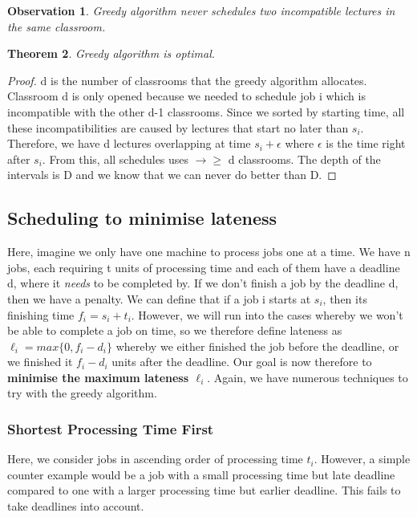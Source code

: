 \documentclass[11pt, oneside]{article}
\newtheorem{theorem}{Theorem}
\newtheorem{observation}[theorem]{\textbf{Observation}}
\theoremstyle{definition}
\begin{document}
\begin{observation}
  Greedy algorithm never schedules two incompatible lectures in the same classroom.
\end{observation}

\begin{theorem}
  Greedy algorithm is optimal.
\end{theorem}
\begin{proof}
  d is the number of classrooms that the greedy algorithm allocates. Classroom d is only opened because we needed to schedule job i which is incompatible with the other d-1 classrooms. Since we sorted by starting time, all these incompatibilities are caused by lectures that start no later than $s_i$. Therefore, we have d lectures overlapping at time $s_i + \epsilon$ where $\epsilon$ is the time right after $s_i$. From this, all schedules uses $\rightarrow \geq$ d classrooms. The depth of the intervals is D and we know that we can never do better than D.
\end{proof}

\subsection{Scheduling to minimise lateness}
Here, imagine we only have one machine to process jobs one at a time. We have n jobs, each requiring t units of processing time and each of them have a deadline d, where it \textit{needs} to be completed by. If we don't finish a job by the deadline d, then we have a penalty. We can define that if a job i starts at $s_i$, then its finishing time $f_i = s_i + t_i$. However, we will run into the cases whereby we won't be able to complete a job on time, so we therefore define lateness as $\ell_i = max\{0, f_i - d_i\}$ whereby we either finished the job before the deadline, or we finished it $f_i - d_i$ units after the deadline. Our goal is now therefore to \textbf{minimise the maximum lateness $\ell_i$}. Again, we have numerous techniques to try with the greedy algorithm.

\subsubsection{Shortest Processing Time First}
Here, we consider jobs in ascending order of processing time $t_i$. However, a simple counter example would be a job with a small processing time but late deadline compared to one with a larger processing time but earlier deadline. This fails to take deadlines into account.
\end{document}

